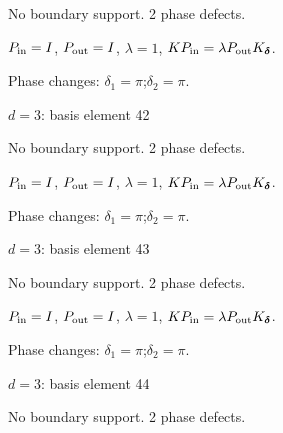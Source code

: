 No boundary support. 2 phase defects.
\begin{center}
\end{center}
\vspace{-1mm}
$P_{\rm in}=I$, \quad $P_{\rm out}=I$, \quad $\lambda=1$, \qquad $K P_{\rm in}=\lambda P_{\rm out}K_{\boldsymbol\delta}$.
\par\smallskip\begin{minipage}{.98\linewidth}\small Phase changes: $\delta_{1}=\pi$;\quad $\delta_{2}=\pi$.\end{minipage}
\vfill
{\footnotesize\texttt{}}
\newpage
{}
{\Large $d=3$: basis element 42}\par
No boundary support. 2 phase defects.
\begin{center}
\end{center}
\vspace{-1mm}
$P_{\rm in}=I$, \quad $P_{\rm out}=I$, \quad $\lambda=1$, \qquad $K P_{\rm in}=\lambda P_{\rm out}K_{\boldsymbol\delta}$.
\par\smallskip\begin{minipage}{.98\linewidth}\small Phase changes: $\delta_{1}=\pi$;\quad $\delta_{2}=\pi$.\end{minipage}
\vfill
{\footnotesize\texttt{}}
\newpage
{}
{\Large $d=3$: basis element 43}\par
No boundary support. 2 phase defects.
\begin{center}
\end{center}
\vspace{-1mm}
$P_{\rm in}=I$, \quad $P_{\rm out}=I$, \quad $\lambda=1$, \qquad $K P_{\rm in}=\lambda P_{\rm out}K_{\boldsymbol\delta}$.
\par\smallskip\begin{minipage}{.98\linewidth}\small Phase changes: $\delta_{1}=\pi$;\quad $\delta_{2}=\pi$.\end{minipage}
\vfill
{\footnotesize\texttt{}}
\newpage
{}
{\Large $d=3$: basis element 44}\par
No boundary support. 2 phase defects.
\begin{center}
\end{center}
